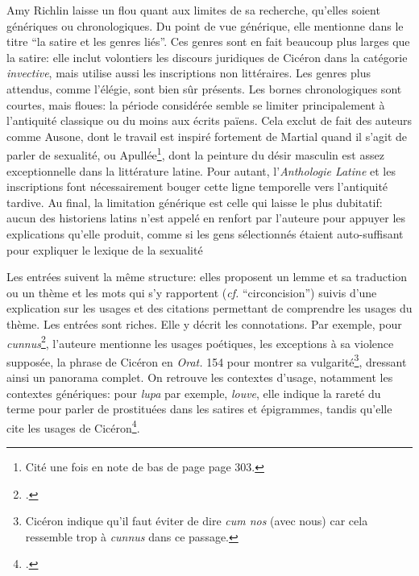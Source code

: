 Amy Richlin laisse un flou quant aux limites de sa recherche, qu'elles soient génériques ou chronologiques. Du point de vue générique, elle mentionne dans le titre \enquote{la satire et les genres liés}. Ces genres sont en fait beaucoup plus larges que la satire: elle inclut volontiers les discours juridiques de Cicéron dans la catégorie \textit{invective}, mais utilise aussi les inscriptions non littéraires. Les genres plus attendus, comme l'élégie, sont bien sûr présents. Les bornes chronologiques sont courtes, mais floues: la période considérée semble se limiter principalement à l'antiquité classique ou du moins aux écrits païens. Cela exclut de fait des auteurs comme Ausone, dont le travail est inspiré fortement de Martial quand il s'agit de parler de sexualité, ou Apullée\footnote{Cité une fois en note de bas de page page 303.}, dont la peinture du désir masculin est assez exceptionnelle dans la littérature latine. Pour autant, l'\textit{Anthologie Latine} et les inscriptions font nécessairement bouger cette ligne temporelle vers l'antiquité tardive. Au final, la limitation générique est celle qui laisse le plus dubitatif: aucun des historiens latins n'est appelé en renfort par l'auteure pour appuyer les explications qu'elle produit, comme si les gens sélectionnés étaient auto-suffisant pour expliquer le lexique de la sexualité

Les entrées suivent la même structure: elles proposent un lemme et sa traduction ou un thème et les mots qui s'y rapportent (\textit{cf.} \enquote{circoncision}) suivis d'une explication sur les usages et des citations permettant de comprendre les usages du thème. Les entrées sont riches. Elle y décrit les connotations. Par exemple, pour \textit{cunnus}\footcite[p.~208]{richlin_sexual_1978}, l'auteure mentionne les usages poétiques, les exceptions à sa violence supposée, la phrase de Cicéron en \textit{Orat.} 154 pour montrer sa vulgarité\footnote{Cicéron indique qu'il faut éviter de dire \textit{cum nos} (avec nous) car cela ressemble trop à \textit{cunnus} dans ce passage.}, dressant ainsi un panorama complet. On retrouve les contextes d'usage, notamment les contextes génériques: pour \textit{lupa} par exemple, \textit{louve}, elle indique la rareté du terme pour parler de prostituées dans les satires et épigrammes, tandis qu'elle cite les usages de Cicéron\footcite[p.~329]{richlin_sexual_1978}.

